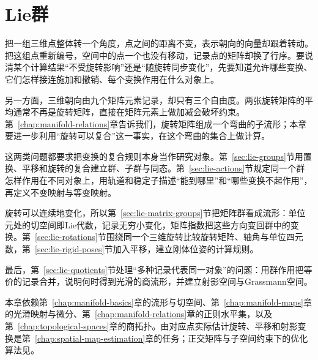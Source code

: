 \chapter{Lie群}
\label{chap:lie-groups}

把一组三维点整体转一个角度，点之间的距离不变，表示朝向的向量却跟着转动。把这组点重新编号，空间中的点一个也没有移动，记录点的矩阵却换了行序。要说清某个计算结果“不受旋转影响”还是“随旋转同步变化”，先要知道允许哪些变换、它们怎样接连施加和撤销、每个变换作用在什么对象上。

另一方面，三维朝向由九个矩阵元素记录，却只有三个自由度。两张旋转矩阵的平均通常不再是旋转矩阵，直接在矩阵元素上做加减会破坏约束。第~\ref{chap:manifold-relations}章告诉我们，旋转矩阵组成一个弯曲的子流形；本章要进一步利用“旋转可以复合”这一事实，在这个弯曲的集合上做计算。

这两类问题都要求把变换的复合规则本身当作研究对象。第~\ref{sec:lie-groups}节用置换、平移和旋转的复合建立群、子群与同态。第~\ref{sec:lie-actions}节规定同一个群怎样作用在不同对象上，用轨道和稳定子描述“能到哪里”和“哪些变换不起作用”，再定义不变映射与等变映射。

旋转可以连续地变化，所以第~\ref{sec:lie-matrix-groups}节把矩阵群看成流形：单位元处的切空间即Lie代数，记录无穷小变化，矩阵指数把这些方向变回群中的变换。第~\ref{sec:lie-rotations}节围绕同一个三维旋转比较旋转矩阵、轴角与单位四元数，第~\ref{sec:lie-rigid-poses}节加入平移，建立刚体位姿的计算规则。

最后，第~\ref{sec:lie-quotients}节处理“多种记录代表同一对象”的问题：用群作用把等价的记录合并，说明何时得到光滑的商流形，并建立射影空间与Grassmann空间。

本章依赖第~\ref{chap:manifold-basics}章的流形与切空间、第~\ref{chap:manifold-maps}章的光滑映射与微分、第~\ref{chap:manifold-relations}章的正则水平集，以及第~\ref{chap:topological-spaces}章的商拓扑。由对应点实际估计旋转、平移和射影变换是第~\ref{chap:spatial-map-estimation}章的任务；正交矩阵与子空间约束下的优化算法见。








